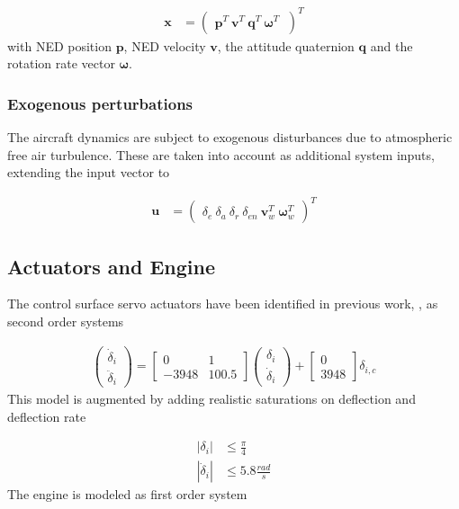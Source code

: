 \documentclass{ifacconf}
\begin{document}
\begin{align}
\mathbf{x} &= 
\begin{pmatrix}
\mathbf{p}^T \:
\mathbf{v}^T \:
\mathbf{q}^T \:
\mathbf{\omega}^T \:
\end{pmatrix}^T 
\end{align}
with NED position $\mathbf{p}$, NED velocity $\mathbf{v}$, the attitude quaternion $\mathbf{q}$ and the rotation rate vector $\mathbf{\omega}$.
\subsubsection{Exogenous perturbations}

The aircraft dynamics are subject to exogenous disturbances due to atmospheric free air turbulence. These are taken into account as additional system inputs, extending the input vector to

\begin{align}
\mathbf{u} &= 
\begin{pmatrix}
\delta_{e} \:
\delta_{a} \:
\delta_{r} \:
\delta_{en} \:
\mathbf{v}_w^T \:
\mathbf{\omega}_w^T
\end{pmatrix}^T
\end{align}

\subsection{Actuators and Engine}
The control surface servo actuators have been identified in previous work, \cite{ameho2013pilotage}, as second order systems 

\begin{align}
\begin{pmatrix}
\dot{\delta}_i \\
\ddot{\delta}_i
\end{pmatrix}
=
\begin{bmatrix}
0 & 1 \\
-3948 & 100.5 
\end{bmatrix}
\begin{pmatrix}
\delta_i \\
\dot{\delta}_i
\end{pmatrix}
+
\begin{bmatrix}
0\\
3948 
\end{bmatrix}
\delta_{i, c}
\end{align}
This model is augmented by adding realistic saturations on deflection and deflection rate

\begin{align}
|\delta_i| &\leq \frac{\pi}{4} \\
|\dot{\delta}_i| &\leq 5.8 \frac{rad}{s}
\end{align}
The engine is modeled as first order system
\end{document}
